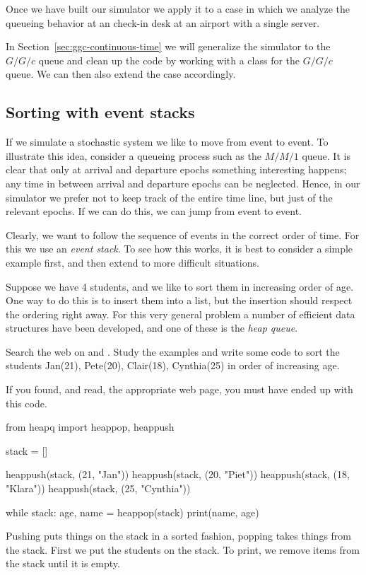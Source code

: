 Once we have built our simulator we apply it to a case in which we analyze the queueing behavior at an check-in desk at an airport with a single server.

In Section~\ref{sec:ggc-continuous-time} we will generalize the simulator to the $G/G/c$ queue and clean up the code by working with a class for the $G/G/c$ queue. We can then also extend the case accordingly. 


\subsection{Sorting with event stacks}
\label{sec:event-stacks}

If we simulate a stochastic system we like to move from event to event.
To illustrate this idea, consider a queueing process such as the $M/M/1$ queue.
It is clear that only at arrival and departure epochs something interesting happens; any time in between arrival and departure epochs can be neglected.
Hence, in our simulator we prefer not to keep track of the entire time line, but just of the relevant epochs.
If we can do this, we can jump from event to event.

Clearly, we want to follow the sequence of events in the correct order of time.
For this we use an \emph{event stack}.
To see how this works, it is best to consider a simple example first, and then extend to more difficult situations.

Suppose we have 4 students, and we like to sort them in increasing order of age.
One way to do this is to insert them into a list, but the insertion should respect the ordering right away.
For this very general problem a number of efficient data structures have been developed, and one of these is the \emph{heap queue}.

\begin{exercise}
  Search the web on  and . Study the examples and write some code to sort the students Jan(21), Pete(20), Clair(18), Cynthia(25) in order of increasing age.

  \begin{solution}
If you found, and read, the appropriate web page, you must have ended up with this code.
\begin{pyverbatim}
from heapq import heappop, heappush

stack = []

heappush(stack, (21, "Jan"))
heappush(stack, (20, "Piet"))
heappush(stack, (18, "Klara"))
heappush(stack, (25, "Cynthia"))

while stack:
    age, name = heappop(stack)
    print(name, age)

  \end{pyverbatim}

Pushing puts things on the stack in a sorted fashion, popping takes things from the stack. First we put the students on the stack. To print, we remove items from the stack until it is empty.
\end{solution}
  
\end{exercise}



